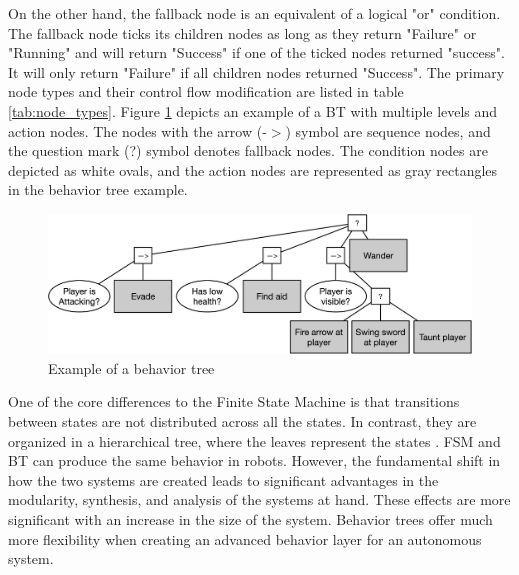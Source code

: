 On the other hand, the fallback node is an equivalent of a logical "or" condition. The fallback node ticks its children nodes as long as they return "Failure" or "Running" and will return "Success" if one of the ticked nodes returned "success". It will only return "Failure" if all children nodes returned "Success". The primary node types and their control flow modification are listed in table \ref{tab:node_types}.
Figure \ref{fig:bt_example} depicts an example of a BT with multiple levels and action nodes. The nodes with the arrow (-$>$) symbol are sequence nodes, and the question mark (?) symbol denotes fallback nodes. The condition nodes are depicted as white ovals, and the action nodes are represented as gray rectangles in the behavior tree example.

\begin{figure}[h!]
	\includegraphics[width=1.0\textwidth]{images/bt_example.jpg} 
	\caption{Example of a behavior tree \cite{iovino2022}}
	\label{fig:bt_example}
\end{figure}

One of the core differences to the Finite State Machine is that transitions between states are not distributed across all the states. In contrast, they are organized in a hierarchical tree, where the leaves represent the states \cite{iovino2022}. FSM and BT can produce the same behavior in robots. However, the fundamental shift in how the two systems are created leads to significant advantages in the modularity, synthesis, and analysis of the systems at hand. These effects are more significant with an increase in the size of the system. Behavior trees offer much more flexibility when creating an advanced behavior layer for an autonomous system. 



